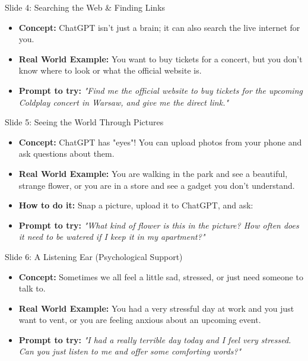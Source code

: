 \documentclass[aspectratio=169]{beamer}
\begin{document}
\begin{frame}{Slide 4: Searching the Web \& Finding Links}
    \begin{itemize}
        \item \textbf{Concept:} ChatGPT isn't just a brain; it can also search the live internet for you.
        \item \textbf{Real World Example:} You want to buy tickets for a concert, but you don't know where to look or what the official website is.
        \item \textbf{Prompt to try:} \textit{"Find me the official website to buy tickets for the upcoming Coldplay concert in Warsaw, and give me the direct link."}
    \end{itemize}
\end{frame}

\begin{frame}{Slide 5: Seeing the World Through Pictures}
    \begin{itemize}
        \item \textbf{Concept:} ChatGPT has "eyes"! You can upload photos from your phone and ask questions about them.
        \item \textbf{Real World Example:} You are walking in the park and see a beautiful, strange flower, or you are in a store and see a gadget you don't understand.
        \item \textbf{How to do it:} Snap a picture, upload it to ChatGPT, and ask:
        \item \textbf{Prompt to try:} \textit{"What kind of flower is this in the picture? How often does it need to be watered if I keep it in my apartment?"}
    \end{itemize}
\end{frame}

\begin{frame}{Slide 6: A Listening Ear (Psychological Support)}
    \begin{itemize}
        \item \textbf{Concept:} Sometimes we all feel a little sad, stressed, or just need someone to talk to.
        \item \textbf{Real World Example:} You had a very stressful day at work and you just want to vent, or you are feeling anxious about an upcoming event.
        \item \textbf{Prompt to try:} \textit{"I had a really terrible day today and I feel very stressed. Can you just listen to me and offer some comforting words?"}
    \end{itemize}
\end{frame}
\end{document}
